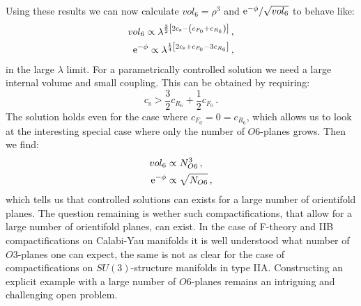 \documentclass[a4paper,12pt]{report}
\newcommand{\be}{\begin{equation}}
\newcommand{\ee}{\end{equation}}
\newcommand{\bea}{\begin{equation}\begin{aligned}}
\newcommand{\eea}{\end{aligned}\end{equation}}
\def\rme{{\rm e}}
\begin{document}
Using these results we can now calculate $vol_6 = \rho^3$ and $\rme^ {-\phi}/\sqrt{vol_6}$ to behave like:
\bea 
vol_6 \propto \lambda^ {\frac{3}{2} \left[ 2 c_{\text{s}} - \left(c_{F_0} + c_{R_6}\right)\right]}\,,\\
\rme^ {-\phi} \propto \lambda^ {\frac{1}{4} \left[2c_{\text{s}}+c_{F_0} -3 c_{R_6}\right]}\,,
\eea
in the large $\lambda$ limit. For a parametrically controlled solution we need a large internal volume and small coupling. This can be obtained by requiring:
\be 
c_{\text{s}} > \frac{3}{2} c_{R_6} + \frac{1}{2} c_{F_0}\,.
\ee
The solution holds even for the case where $c_{F_0} = 0 = c_{R_6}$, which allows us to look at the interesting special case where only the number of $O6$-planes grows. Then we find:
\bea
vol_6 &\propto N^ 3_{O6}\,,\\
\rme^ {-\phi} &\propto \sqrt{N_{O6}}\,,
\eea
which tells us that controlled solutions can exists for a large number of orientifold planes. The question remaining is wether such compactifications, that allow for a large number of orientifold planes, can exist. In the case of F-theory and IIB compactifications on Calabi-Yau manifolds it is well understood what number of $O3$-planes one can expect, the same is not as clear for the case of compactifications on $SU(3)$-structure manifolds in type IIA. Constructing an explicit example with a large number of $O6$-planes remains an intriguing and challenging open problem.
\end{document}
